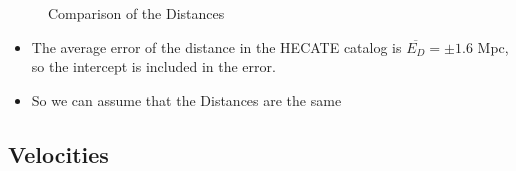 \documentclass[
]{article}
\providecommand{\tightlist}{%
  \setlength{\itemsep}{0pt}\setlength{\parskip}{0pt}}\usepackage{longtable,booktabs,array}
\begin{document}
\begin{figure}


\caption{\label{fig-coord-compare}Comparison of the Distances}

\end{figure}%

\begin{itemize}
\tightlist
\item
  The average error of the distance in the HECATE catalog is
  \(\overline{E_D} = \pm 1.6\) Mpc, so the intercept is included in the
  error.
\item
  So we can assume that the Distances are the same
\end{itemize}

\subsection{Velocities}\label{velocities}
\end{document}
